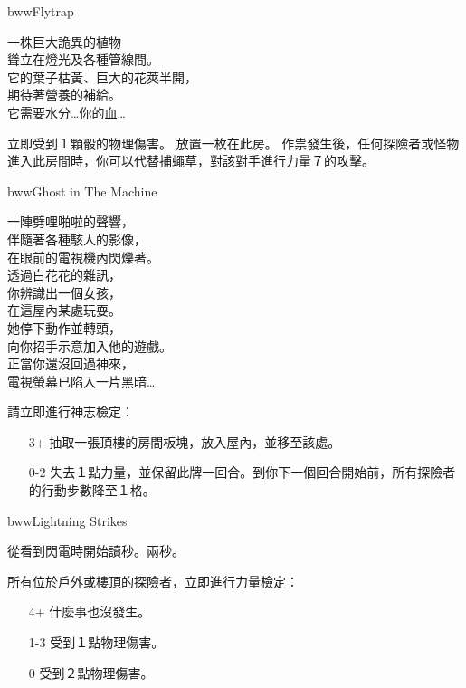 \linebreak[0]%
\begin{EventCard}{bww}{Flytrap}
  \begin{CardStory}
    一株巨大詭異的植物\\
    聳立在燈光及各種管線間。\\
    它的葉子枯黃、巨大的花莢半開，\\
    期待著營養的補給。\\
    它需要水分…你的血…
  \end{CardStory}
  立即受到１顆骰的物理傷害。\smallbreak
  放置一枚在此房。\smallbreak
  作祟發生後，任何探險者或怪物進入此房間時，你可以代替捕蠅草，對該對手進行力量７的攻擊。\smallbreak
\end{EventCard}%
\linebreak[0]%
\begin{EventCard}{bww}{Ghost in The Machine}
  \begin{CardStory}
    一陣劈哩啪啦的聲響，\\
    伴隨著各種駭人的影像，\\
    在眼前的電視機內閃爍著。\\
    透過白花花的雜訊，\\
    你辨識出一個女孩，\\
    在這屋內某處玩耍。\\
    她停下動作並轉頭，\\
    向你招手示意加入他的遊戲。\\
    正當你還沒回過神來，\\
    電視螢幕已陷入一片黑暗…
  \end{CardStory}
  請立即進行神志檢定：
  \begin{itemize}
    \item[3+] 抽取一張頂樓的房間板塊，放入屋內，並移至該處。
    \item[0-2] 失去１點力量，並保留此牌一回合。到你下一個回合開始前，所有探險者的行動步數降至１格。
  \end{itemize}
\end{EventCard}%
\linebreak[0]%
\begin{EventCard}{bww}{Lightning Strikes}
  \begin{CardStory}
    從看到閃電時開始讀秒。兩秒。
  \end{CardStory}
  所有位於戶外或樓頂的探險者，立即進行力量檢定：
  \begin{itemize}
    \item[4+] 什麼事也沒發生。
    \item[1-3] 受到１點物理傷害。
    \item[0] 受到２點物理傷害。
  \end{itemize}
\end{EventCard}%
